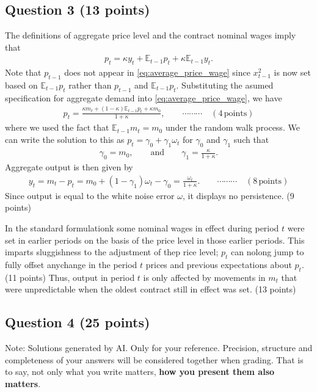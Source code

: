 \documentclass[12pt]{article}
\begin{document}
\subsection*{Question 3 (13 points)}
The definitions of aggregate price level and the contract nominal wages imply that
\begin{align}\label{eq:average_price_wage}
    p_t = \kappa y_t + \mathbb{E}_{t-1}p_t + \kappa \mathbb{E}_{t-1} y_t.
\end{align}
Note that $p_{t-1}$ does not appear in \eqref{eq:average_price_wage} since $x_{t-1}^2$ is now set based on $\mathbb{E}_{t-1}p_t$ rather than $p_{t-1}$ and $\mathbb{E}_{t-1} p_t$. Substituting the asumed specification for aggregate demand into \eqref{eq:average_price_wage}, we have
\begin{align*}
    p_t = \frac{\kappa m_t + (1-\kappa) \mathbb{E}_{t-1} p_t + \kappa m_0}{1+\kappa}, \qquad \cdots\cdots\cdots \quad (4\, \text{points})
\end{align*}
where we used the fact that $\mathbb{E}_{t-1} m_t = m_0$ under the random walk process. We can write the solution to this as $p_t = \gamma_0 + \gamma_1 \omega_t$ for $\gamma_0$ and $\gamma_1$ such that
\begin{align*}
    \gamma_0 = m_0, \qquad \text{and} \qquad \gamma_1 = \frac{\kappa}{1+\kappa}.
\end{align*}
Aggregate output is then given by
\begin{align*}
    y_t  = m_t - p_t = m_0 + (1-\gamma_1)\omega_t - \gamma_0 = \frac{\omega_t}{1+\kappa}. \qquad \cdots\cdots\cdots \quad (8\, \text{points})
\end{align*}
Since output is equal to the white noise error $\omega$, it displays no persistence. (9 points) 

In the standard formulationk some nominal wages in effect during period $t$ were set in earlier periods on the basis of the price level in those earlier periods. This imparts sluggishness to the adjustment of thep rice level; $p_t$ can nolong jump to fully offset anychange in the period $t$ prices and previous expectations about $p_t$. (11 points) Thus, output in period $t$ is only affected by movements in $m_t$ that were unpredictable when the oldest contract still in effect was set. (13 points)

\newpage
\subsection*{Question 4 (25 points)}
Note: Solutions generated by AI. Only for your reference. Precision, structure and completeness of your answers will be considered together when grading. That is to say, not only what you write matters, \textbf{how you present them also matters}.
\end{document}
